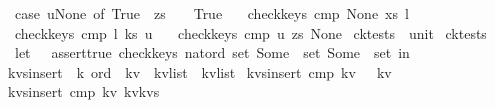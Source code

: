 \begin{isabellebody}
\ \ {\isacharparenleft}case\ u{\isacharequal}None\ of\ True\ {\isasymRightarrow}\ zs{\isacharequal}{\isacharbraceleft}{\isacharbraceright}\ {\isacharbar}\ {\isacharunderscore}\ {\isasymRightarrow}\ True{\isacharparenright}\ {\isacharampersand}\isanewline
\ \ {\isacharparenleft}check{\isacharunderscore}keys\ cmp\ None\ xs\ l{\isacharparenright}\ {\isacharampersand}\isanewline
\ \ {\isacharparenleft}check{\isacharunderscore}keys\ cmp\ l\ ks\ u{\isacharparenright}\ {\isacharampersand}\isanewline
\ \ {\isacharparenleft}check{\isacharunderscore}keys\ cmp\ u\ zs\ None{\isacharparenright}\isanewline
{\isacharparenright}{\isachardoublequoteclose}\isanewline
\isanewline
{}\isamarkupfalse%
\ ck{}{\isacharunderscore}tests\ {\isacharcolon}{\isacharcolon}\ unit\ \isanewline
{\isachardoublequoteopen}ck{}{\isacharunderscore}tests\ {\isacharequal}\ {\isacharparenleft}\isanewline
\ \ let\ {\isacharunderscore}\ {\isacharequal}\ assert{\isacharunderscore}true\ {\isacharparenleft}check{\isacharunderscore}keys{\isacharunderscore}{}\ nat{\isacharunderscore}ord\ {\isacharparenleft}set{\isacharbrackleft}{}{\isacharbrackright}{\isacharparenright}\ {\isacharparenleft}Some\ {}{\isacharparenright}\ {\isacharparenleft}set{\isacharbrackleft}{}{\isacharcomma}{}{\isacharcomma}{}{\isacharbrackright}{\isacharparenright}\ {\isacharparenleft}Some\ {}{\isacharparenright}\ {\isacharparenleft}set{\isacharbrackleft}{}{\isacharcomma}{}{\isacharbrackright}{\isacharparenright}{\isacharparenright}\ in\isanewline
\ \ {\isacharparenleft}{\isacharparenright}{\isacharparenright}{\isachardoublequoteclose}\isanewline
\isanewline
\isanewline
\isanewline
\isanewline
\isanewline
\isanewline
\isanewline
{}\isamarkupfalse%
\ kvs{\isacharunderscore}insert\ {\isacharcolon}{\isacharcolon}\ {\isachardoublequoteopen}{\isacharprime}k\ ord\ {\isasymRightarrow}\ {\isacharprime}k{\isacharasterisk}{\isacharprime}v\ {\isasymRightarrow}\ {\isacharparenleft}{\isacharprime}k{\isacharasterisk}{\isacharprime}v{\isacharparenright}list\ {\isasymRightarrow}\ {\isacharparenleft}{\isacharprime}k{\isacharasterisk}{\isacharprime}v{\isacharparenright}list{\isachardoublequoteclose}\ \isanewline
{\isachardoublequoteopen}kvs{\isacharunderscore}insert\ cmp\ kv\ {\isacharbrackleft}{\isacharbrackright}\ {\isacharequal}\ {\isacharbrackleft}kv{\isacharbrackright}{\isachardoublequoteclose}\isanewline
{\isacharbar}\ {\isachardoublequoteopen}kvs{\isacharunderscore}insert\ cmp\ kv\ {\isacharparenleft}kv{\isacharprime}{\isacharhash}kvs{\isacharprime}{\isacharparenright}\ {\isacharequal}\ {\isacharparenleft}\isanewline

\end{isabellebody}

